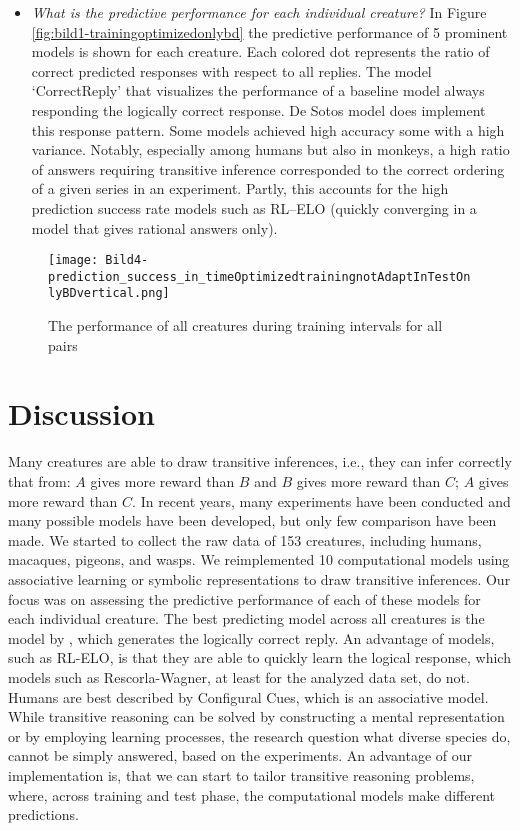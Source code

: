 \documentclass[10pt,letterpaper]{article}
\begin{document}
	
	
	\begin{itemize}
		\item \emph{What is the predictive performance for each individual creature?} In Figure \ref{fig:bild1-trainingoptimizedonlybd} the predictive performance of 5 prominent models is shown for each creature. Each colored dot represents the ratio of correct predicted responses with respect to all replies. The model `CorrectReply' that visualizes the performance of a baseline model always responding the logically correct response. De Sotos model does implement this response pattern. Some models achieved high accuracy some with a high variance. Notably, especially among humans but also in monkeys, a high ratio of answers requiring transitive inference corresponded to the correct ordering of a given series in an experiment. Partly, this accounts for the high prediction success rate models such as RL--ELO (quickly converging in a model that gives rational answers only). 
		
	\end{itemize}
	
	
	\begin{figure}
		\centering
		\texttt{[image: Bild4-prediction\_success\_in\_timeOptimizedtrainingnotAdaptInTestOnlyBDvertical.png]}
		\caption{The performance of all creatures during training intervals for all pairs}
		\label{fig:time}
	\end{figure}
	
	\section{Discussion}
	Many creatures are able to draw transitive inferences, i.e., they can infer correctly that from: $A$ gives more reward than $B$ and $B$ gives more reward than $C$; $A$ gives more reward than $C$. In recent years, many experiments have been conducted and many possible models have been developed, but only few comparison have been made. We started to collect the raw data of  153 creatures, including humans, macaques, pigeons, and wasps. We reimplemented 10 computational models using associative learning or symbolic representations to draw transitive inferences. Our focus was on assessing the predictive performance of each of these models for each individual creature. The best predicting model across all creatures is the model by , which generates the logically correct reply. An advantage of models, such as RL-ELO, is that they are able to quickly learn the logical response, which models such as Rescorla-Wagner, at least for the analyzed data set, do not. Humans are best described by Configural Cues, which is an associative model. While transitive reasoning can be solved by constructing a mental representation or by employing learning processes, the research question what diverse species do, cannot be simply answered, based on the experiments. An advantage of our implementation is, that we can start to tailor transitive reasoning problems, where, across training and test phase, the computational models make different predictions.
	
\end{document}
